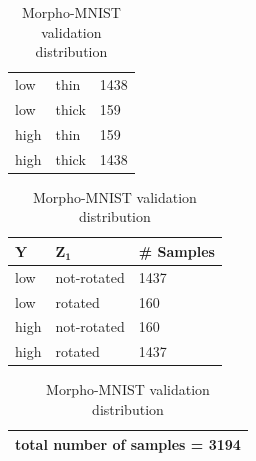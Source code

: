\documentclass[12pt,DIV14,BCOR12mm,a4paper,footinclude=false,headinclude,parskip=half-,twoside,openright,cleardoublepage=empty,toc=index,bibliography=totoc,listof=totoc]{scrreprt}
\numberwithin{equation}{chapter}
\begin{document}
\begin{table}[H]
\begin{minipage}[H]{\linewidth}
\begin{minipage}[H]{0.5\linewidth}
\begin{tabular}{|p{1cm}|p{2cm}|p{2cm}|}
                \hline
                low & thin & 1438 \\
                low & thick & 159\\
                high & thin & 159 \\
                high & thick & 1438\\
                \hline
            \end{tabular}
            \begin{tabular}{|p{1cm}|p{2cm}|p{2cm}|}
                \hline
                $\mathbf{Y}$ & $\mathbf{Z_1}$ & \# \textbf{Samples } \\
                \hline
                low & not-rotated & 1437 \\
                low & rotated & 160\\
                high & not-rotated & 160 \\
                high & rotated & 1437\\
                \hline
            \end{tabular}
            \begin{tabular}{|p{5.88cm}|}
                 \hline
                 total number of samples = 3194 \\
                 \hline
            \end{tabular}
        \end{minipage}%
        \caption{Morpho-MNIST validation distribution} 
        \label{tab:valMMNIST}
    \end{minipage}%
\end{table}
\end{document}
